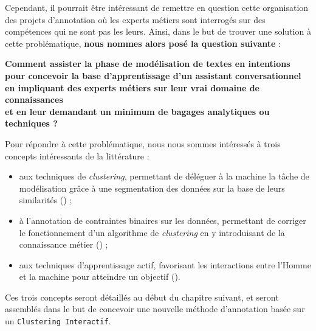	
	Cependant, il pourrait être intéressant de remettre en question cette organisation des projets d'annotation où les experts métiers sont interrogés sur des compétences qui ne sont pas les leurs.
	Ainsi, dans le but de trouver une solution à cette problématique, \textbf{nous nommes alors posé la question suivante} :
	\begin{leftBarImportantGreen}
		\begin{center}
		\textbf{
			Comment assister la phase de modélisation de textes en intentions \\
			pour concevoir la base d'apprentissage d'un assistant conversationnel \\
			en impliquant des experts métiers sur leur vrai domaine de connaissances \\
			et en leur demandant un minimum de bagages analytiques ou techniques ?
		}
		\end{center}
	\end{leftBarImportantGreen}
	
	
	\begin{leftBarIdea}
		Pour répondre à cette problématique, nous nous sommes intéressés à trois concepts intéressants de la littérature :
		\begin{itemize}
			\item aux techniques de \textit{clustering}, permettant de déléguer à la machine la tâche de modélisation grâce à une segmentation des données sur la base de leurs similarités (\cite{xu-tian:2015:comprehensive-survey-clustering}) ;
			\item à l'annotation de contraintes binaires sur les données, permettant de corriger le fonctionnement d'un algorithme de \textit{clustering} en y introduisant de la connaissance métier (\cite{lampert-etal:2018:constrained-distance-based}) ;
			\item aux techniques d'apprentissage actif, favorisant les interactions entre l'Homme et la machine pour atteindre un objectif (\cite{settles:2010:active-learning-literature}).
		\end{itemize}
		Ces trois concepts seront détaillés au début du chapitre suivant, et seront assemblés dans le but de concevoir une nouvelle méthode d'annotation basée sur un \texttt{Clustering Interactif}.
	\end{leftBarIdea}